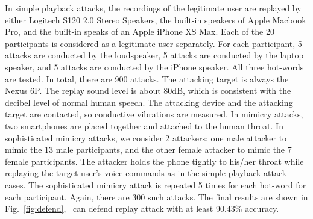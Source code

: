 In simple playback attacks, the recordings of the legitimate user are replayed by either Logitech S120 2.0 Stereo Speakers, the built-in speakers of Apple Macbook Pro, and the built-in speaks of an Apple iPhone XS Max. Each of the 20 participants is considered as a legitimate user separately. For each participant, 5 attacks are conducted by the loudspeaker, 5 attacks are conducted by the laptop speaker, and 5 attacks are conducted by the iPhone speaker. All three hot-words are tested. In total, there are 900 attacks. The attacking target is always the Nexus 6P. The replay sound level is about 80dB, which is consistent with the decibel level of normal human speech. 
The attacking device and the attacking target are contacted, so conductive vibrations are measured. 
In mimicry attacks, two smartphones are placed together and attached to the human throat. In sophisticated mimicry attacks, we consider 2 attackers: one male attacker to mimic the 13 male participants, and the other female attacker to mimic the 7 female participants. The attacker holds the phone tightly to his/her throat while replaying the target user's voice commands as in the simple playback attack cases. The sophisticated mimicry attack is repeated 5 times for each hot-word for each participant. Again, there are 300 such attacks. The final results are shown in Fig.~\ref{fig:defend}, \shortname~can defend replay attack with at least 90.43\% accuracy.

